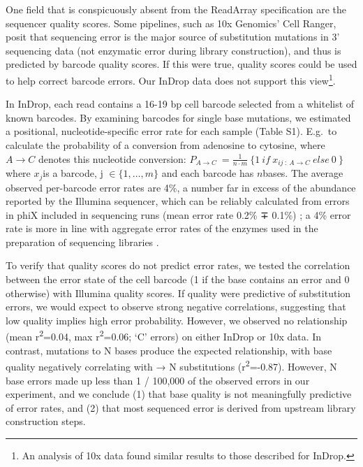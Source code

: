 
One field that is conspicuously absent from the ReadArray specification are the sequencer quality scores.  
Some pipelines, such as 10x Genomics' Cell Ranger, posit that sequencing error is the major source of substitution mutations in 3' sequencing data (not enzymatic error during library construction), and thus is predicted by barcode quality scores. 
If this were true, quality scores could be used to help correct barcode errors. 
Our InDrop data does not support this view\footnote{An analysis of 10x data found similar results to those described for InDrop.}. 

In InDrop, each read contains a 16-19 bp cell barcode selected from a whitelist of known barcodes. 
By examining barcodes for single base mutations, we estimated a positional, nucleotide-specific error rate for each sample (Table S1). E.g.\ to calculate the probability of a conversion from adenosine to cytosine, where \(A \rightarrow C\) denotes this nucleotide conversion: \(P_{A \rightarrow C}\  = \frac{1}{n \cdot m}\ \{ 1\ if\ x_{ij\ :\ A \rightarrow C}\ else\ 0\ \}\) where \(x_{j}\)is a barcode, \(\text{j\ } \in \{ 1,\ldots,m\}\) and each barcode has \(n\)bases. %
The average observed per-barcode error rates are 4\%, a number far in excess of the abundance reported by the Illumina sequencer, which can be reliably calculated from errors in phiX included in sequencing runs (mean error rate 0.2\% ∓ 0.1\%) \citep{Manley2016}; a 4\% error rate is more in line with aggregate error rates of the enzymes used in the preparation of sequencing libraries \citep{Zilionis2017}.

To verify that quality scores do not predict error rates, we tested the correlation between the error state of the cell barcode (1 if the base contains an error and 0 otherwise) with Illumina quality scores. 
If quality were predictive of substitution errors, we would expect to observe strong negative correlations, suggesting that low quality implies high error probability. 
However, we observed no relationship (mean r\textsuperscript{2}=0.04, max r\textsuperscript{2}=0.06; `C' errors) on either InDrop or 10x data.
In contrast, mutations to N bases produce the expected relationship, with base quality negatively correlating with → N substitutions (r\textsuperscript{2}=-0.87). However, N base errors made up less than 1 / 100,000 of the observed errors in our experiment, and we conclude (1) that base quality is not meaningfully predictive of error rates, and (2) that most sequenced error is derived from upstream library construction steps.

